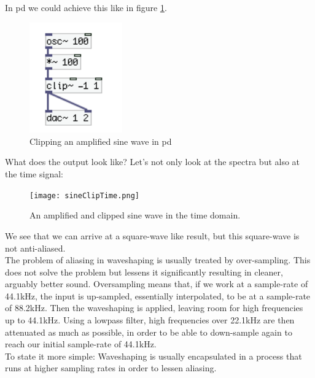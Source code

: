 In pd we could achieve this like in figure \ref{fig:pdClipping}.

\begin{figure}[H]
	\begin{center}
		\includegraphics[width = 4cm]{img/pdSineClipping.png}
		\caption{Clipping an amplified sine wave in pd}
		\label{fig:pdClipping}
	\end{center}
\end{figure}

What does the output look like? Let's not only look at the spectra but also at the time signal:


\begin{figure}[H]
	\begin{center}
		\texttt{[image: sineClipTime.png]}
		\caption{An amplified and clipped sine wave in the time domain.}
		\label{fig:timeClip}
	\end{center}
\end{figure}

We see that we can arrive at a square-wave like result, but this square-wave is not anti-aliased.\\

The problem of aliasing in waveshaping is usually treated by over-sampling. This does not solve the problem but lessens it significantly resulting in cleaner, arguably better sound. Oversampling means that, if we work at a sample-rate of 44.1kHz, the input is up-sampled, essentially interpolated, to be at a sample-rate of 88.2kHz. Then the waveshaping is applied, leaving room for high frequencies up to 44.1kHz. Using a lowpass filter, high frequencies over 22.1kHz are then attenuated as much as possible, in order to be able to down-sample again to reach our initial sample-rate of 44.1kHz. \\
To state it more simple: Waveshaping is usually encapsulated in a process that runs at higher sampling rates in order to lessen aliasing. 





